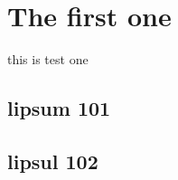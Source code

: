\documentclass[11pt]{book}
\begin{document}
\chapter{The first one}
this is test one 
\minitoc

\section{lipsum 101}
\lipsum[4-6]
\section{lipsul 102}
\lipsum[6-8]
\end{document}
